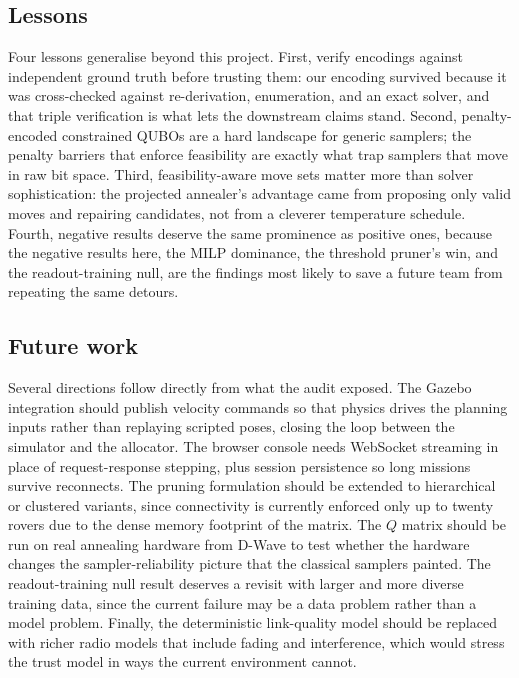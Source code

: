 \subsection{Lessons}

Four lessons generalise beyond this project. First, verify encodings
against independent ground truth before trusting them: our encoding survived
because it was cross-checked against re-derivation, enumeration, and an
exact solver, and that triple verification is what lets the downstream
claims stand. Second, penalty-encoded constrained QUBOs are a hard landscape
for generic samplers; the penalty barriers that enforce feasibility are
exactly what trap samplers that move in raw bit space. Third,
feasibility-aware move sets matter more than solver sophistication: the
projected annealer's advantage came from proposing only valid moves and
repairing candidates, not from a cleverer temperature schedule. Fourth,
negative results deserve the same prominence as positive ones, because the
negative results here, the MILP dominance, the threshold pruner's win, and
the readout-training null, are the findings most likely to save a future
team from repeating the same detours.

\subsection{Future work}

Several directions follow directly from what the audit exposed. The Gazebo
integration should publish velocity commands so that physics drives the
planning inputs rather than replaying scripted poses, closing the loop
between the simulator and the allocator. The browser console needs WebSocket
streaming in place of request-response stepping, plus session persistence so
long missions survive reconnects. The pruning formulation should be extended
to hierarchical or clustered variants, since connectivity is currently
enforced only up to twenty rovers due to the dense memory footprint of the
matrix. The $Q$ matrix should be run on real annealing hardware from D-Wave
to test whether the hardware changes the sampler-reliability picture that
the classical samplers painted. The readout-training null result deserves a
revisit with larger and more diverse training data, since the current
failure may be a data problem rather than a model problem. Finally, the
deterministic link-quality model should be replaced with richer radio models
that include fading and interference, which would stress the trust model in
ways the current environment cannot.

